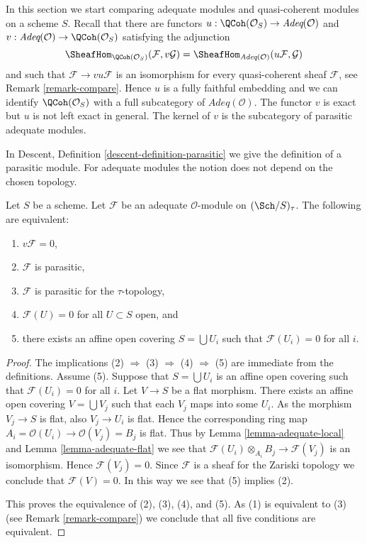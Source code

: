\noindent
In this section we start comparing adequate modules and quasi-coherent
modules on a scheme $S$. Recall that there are functors
$u : \QCoh(\mathcal{O}_S) \to \textit{Adeq}(\mathcal{O})$
and
$v : \textit{Adeq}(\mathcal{O}) \to \QCoh(\mathcal{O}_S)$
satisfying the adjunction
$$
\SheafHom_{\QCoh(\mathcal{O}_S)}(\mathcal{F}, v\mathcal{G})
=
\SheafHom_{\textit{Adeq}(\mathcal{O})}(u\mathcal{F}, \mathcal{G})
$$
and such that $\mathcal{F} \to vu\mathcal{F}$ is an isomorphism for
every quasi-coherent sheaf $\mathcal{F}$, see
Remark \ref{remark-compare}.
Hence $u$ is a fully faithful embedding and we can identify
$\QCoh(\mathcal{O}_S)$ with a full subcategory of
$\textit{Adeq}(\mathcal{O})$.
The functor $v$ is exact but $u$ is not left exact in general.
The kernel of $v$ is the subcategory of parasitic adequate modules.

\medskip\noindent
In Descent, Definition \ref{descent-definition-parasitic}
we give the definition of a parasitic module.
For adequate modules the notion does not depend
on the chosen topology.

\begin{lemma}
\label{lemma-parasitic-adequate}
Let $S$ be a scheme.
Let $\mathcal{F}$ be an adequate $\mathcal{O}$-module on
$(\Sch/S)_\tau$. The following are equivalent:
\begin{enumerate}
\item $v\mathcal{F} = 0$,
\item $\mathcal{F}$ is parasitic,
\item $\mathcal{F}$ is parasitic for the $\tau$-topology,
\item $\mathcal{F}(U) = 0$ for all $U \subset S$ open, and
\item there exists an affine open covering $S = \bigcup U_i$
such that $\mathcal{F}(U_i) = 0$ for all $i$.
\end{enumerate}
\end{lemma}

\begin{proof}
The implications (2) $\Rightarrow$ (3) $\Rightarrow$ (4) $\Rightarrow$ (5)
are immediate from the definitions. Assume (5). Suppose that
$S = \bigcup U_i$ is an affine open covering such that $\mathcal{F}(U_i) = 0$
for all $i$. Let $V \to S$ be a flat morphism. There exists an affine
open covering $V = \bigcup V_j$ such that each $V_j$ maps into some
$U_i$. As the morphism $V_j \to S$ is flat, also $V_j \to U_i$ is flat. 
Hence the corresponding ring map
$A_i = \mathcal{O}(U_i) \to \mathcal{O}(V_j) = B_j$ is flat. Thus by
Lemma \ref{lemma-adequate-local}
and
Lemma \ref{lemma-adequate-flat}
we see that $\mathcal{F}(U_i) \otimes_{A_i} B_j \to \mathcal{F}(V_j)$
is an isomorphism. Hence $\mathcal{F}(V_j) = 0$. Since $\mathcal{F}$ is
a sheaf for the Zariski topology we conclude that $\mathcal{F}(V) = 0$.
In this way we see that (5) implies (2).

\medskip\noindent
This proves the equivalence of (2), (3), (4), and (5).
As (1) is equivalent to (3) (see
Remark \ref{remark-compare})
we conclude that all five conditions are equivalent.
\end{proof}

